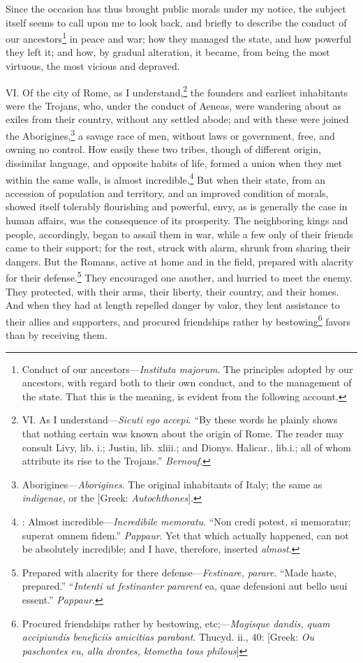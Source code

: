 Since the occasion has thus brought public morals under my notice, the
subject itself seems to call upon me to look back, and briefly to
describe the conduct of our ancestors\footnote{Conduct of our ancestors—\emph{Instituta majorum}. The principles
adopted by our ancestors, with regard both to their own conduct, and
to the management of the state. That this is the meaning, is evident
from the following account.} in peace and war; how they
managed the state, and how powerful they left it; and how, by gradual
alteration, it became, from being the most virtuous, the most vicious
and depraved.

VI. Of the city of Rome, as I understand,\footnote{VI. As I understand—\emph{Sicuti ego accepi}. ``By these words he
plainly shows that nothing certain was known about the origin of Rome.
The reader may consult Livy, lib. i.; Justin, lib. xliii.; and Dionys.
Halicar., lib.i.; all of whom attribute its rise to the Trojans.''
\emph{Bernouf}.} the founders and
earliest inhabitants were the Trojans, who, under the conduct of
Aeneas, were wandering about as exiles from their country, without any
settled abode; and with these were joined the Aborigines,\footnote{Aborigines—\emph{Aborigines}. The original inhabitants of Italy;
the same as \emph{indigenae}, or the [Greek: \emph{Autochthones}].} a savage
race of men, without laws or government, free, and owning no control.
How easily these two tribes, though of different origin, dissimilar
language, and opposite habits of life, formed a union when they met
within the same walls, is almost incredible.\footnote{: Almost incredible—\emph{Incredibile memoratu}. ``Non credi potest,
si memoratur; superat omnem fidem.'' \emph{Pappaur}. Yet that which
actually happened, can not be absolutely incredible; and I have,
therefore, inserted \emph{almost}.} But when their state,
from an accession of population and territory, and an improved
condition of morals, showed itself tolerably flourishing and powerful,
envy, as is generally the case in human affairs, was the consequence
of its prosperity. The neighboring kings and people, accordingly,
began to assail them in war, while a few only of their friends came to
their support; for the rest, struck with alarm, shrunk from sharing
their dangers. But the Romans, active at home and in the field,
prepared with alacrity for their defense.\footnote{Prepared with alacrity for there defense—\emph{Festinare, parare}.
``Made haste, prepared.'' ``\emph{Intenti ut festinanter pararent} ea, quae
defensioni aut bello usui essent.'' \emph{Pappaur}.} They encouraged one
another, and hurried to meet the enemy. They protected, with their
arms, their liberty, their country, and their homes. And when they had
at length repelled danger by valor, they lent assistance to their
allies and supporters, and procured friendships rather by
bestowing\footnote{Procured friendships rather by bestowing, etc;—\emph{Magisque
dandis, quam accipiundis beneficiis amicitias parabant}. Thucyd. ii.,
40: [Greek: \emph{Ou paschontes eu, alla drontes, ktometha tous philous}]} favors than by receiving them.


